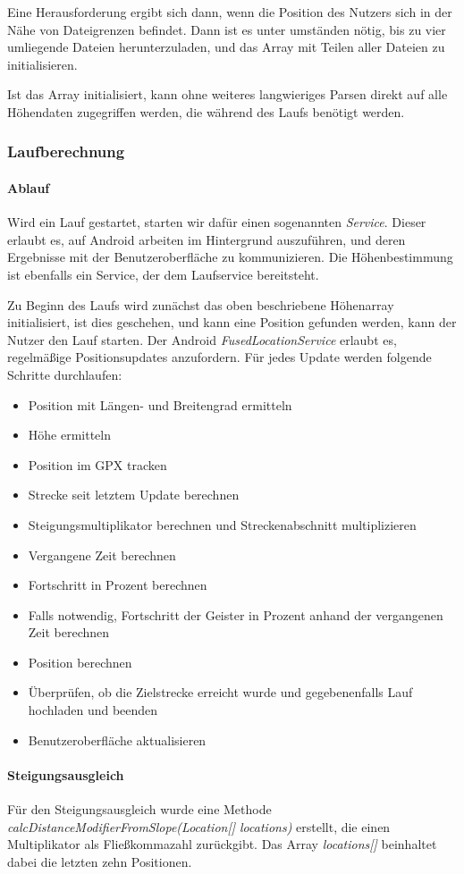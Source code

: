 Eine Herausforderung ergibt sich dann, wenn die Position des Nutzers sich in der Nähe von Dateigrenzen befindet. Dann ist es unter umständen nötig, bis zu vier umliegende Dateien herunterzuladen, und das Array mit Teilen aller Dateien zu initialisieren.

Ist das Array initialisiert, kann ohne weiteres langwieriges Parsen direkt auf alle Höhendaten zugegriffen werden, die während des Laufs benötigt werden.
\subsubsection{Laufberechnung}
\paragraph{Ablauf}
Wird ein Lauf gestartet, starten wir dafür einen sogenannten \textit{Service}. Dieser erlaubt es, auf Android arbeiten im Hintergrund auszuführen, und deren Ergebnisse mit der Benutzeroberfläche zu kommunizieren. Die Höhenbestimmung ist ebenfalls ein Service, der dem Laufservice bereitsteht.

Zu Beginn des Laufs wird zunächst das oben beschriebene Höhenarray initialisiert, ist dies geschehen, und kann eine Position gefunden werden, kann der Nutzer den Lauf starten. Der Android \textit{FusedLocationService} erlaubt es, regelmäßige Positionsupdates anzufordern. Für jedes Update werden folgende Schritte durchlaufen:
\begin{itemize}
\item Position mit Längen- und Breitengrad ermitteln
\item Höhe ermitteln
\item Position im GPX tracken
\item Strecke seit letztem Update berechnen
\item Steigungsmultiplikator berechnen und Streckenabschnitt multiplizieren
\item Vergangene Zeit berechnen
\item Fortschritt in Prozent berechnen
\item Falls notwendig, Fortschritt der Geister in Prozent anhand der vergangenen Zeit berechnen
\item Position berechnen
\item Überprüfen, ob die Zielstrecke erreicht wurde und gegebenenfalls Lauf hochladen und beenden
\item Benutzeroberfläche aktualisieren
\end{itemize}
\paragraph{Steigungsausgleich}
Für den Steigungsausgleich wurde eine Methode  \textit{calcDistanceModifierFromSlope(Location[] locations)} erstellt, die einen Multiplikator als Fließkommazahl zurückgibt. Das Array \textit{locations[]} beinhaltet dabei die letzten zehn Positionen.

